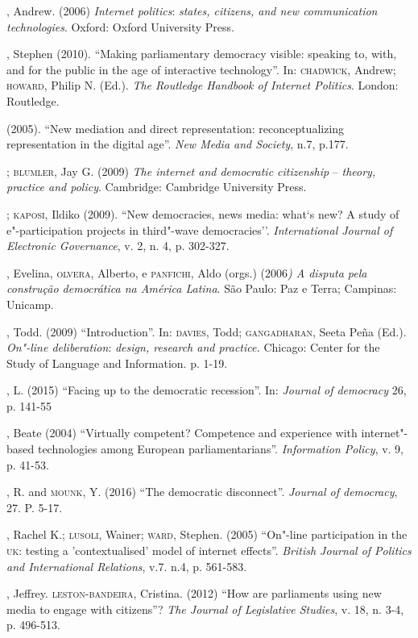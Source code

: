 \begin{bibliohedra}
, Andrew. (2006) \emph{Internet politics}: \emph{states,
citizens, and new communication technologies}. Oxford: Oxford University
Press.

, Stephen (2010). ``Making parliamentary democracy visible:
speaking to, with, and for the public in the age of interactive
technology''. In: \textsc{chadwick}, Andrew; \textsc{howard}, Philip N. (Ed.). \emph{The
Routledge Handbook of Internet Politics}. London: Routledge.

\titidem\mbox{} (2005). ``New mediation and direct representation:
reconceptualizing representation in the digital age''. \emph{New Media
and Society}, n.7, p.177.

\titidem; \textsc{blumler}, Jay G. (2009) \emph{The internet and
democratic citizenship} -- \emph{theory, practice and policy}.
Cambridge: Cambridge University Press.

\titidem; \textsc{kaposi}, Ildiko (2009). ``New democracies, news media:
what`s new? A study of e"-participation projects in third"-wave
democracies''. \emph{International Journal of Electronic Governance}, v.
2, n. 4, p. 302-327.

, Evelina, \textsc{olvera}, Alberto, e \textsc{panfichi}, Aldo (orgs.) (2006\emph{)
A disputa pela construção democrática na América Latina}. São Paulo: Paz
e Terra; Campinas: Unicamp.

, Todd. (2009) ``Introduction''. In: \textsc{davies}, Todd; \textsc{gangadharan},
Seeta Peña (Ed.). \emph{On"-line deliberation}: \emph{design, research
and practice.} Chicago: Center for the Study of Language and
Information. p. 1-19.

, L. (2015) ``Facing up to the democratic recession''. In:
\emph{Journal of democracy} 26, p. 141-55

, Beate (2004) ``Virtually competent? Competence and experience
with internet"-based technologies among European parliamentarians''.
\emph{Information Policy}, v. 9, p. 41-53.

, R. and \textsc{mounk}, Y. (2016) ``The democratic disconnect''.
\emph{Journal of democracy}, 27. P. 5-17.

, Rachel K.; \textsc{lusoli}, Wainer; \textsc{ward}, Stephen. (2005) ``On"-line
participation in the \textsc{uk}: testing a 'contextualised' model of internet
effects''. \emph{British Journal of Politics and International
Relations}, v.7. n.4, p. 561-583.

, Jeffrey. \textsc{leston}-\textsc{bandeira}, Cristina. (2012) ``How are
parliaments using new media to engage with citizens''? \emph{The Journal
of Legislative Studies}, v. 18, n. 3-4, p. 496-513.


\end{bibliohedra}
